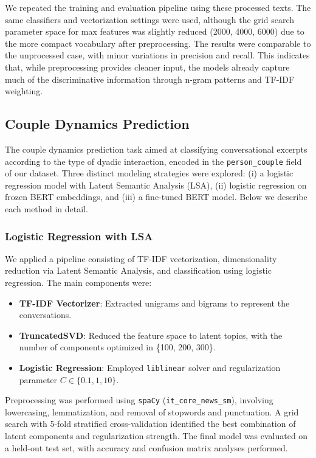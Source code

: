 \documentclass[conference]{IEEEtran}
\begin{document}
We repeated the training and evaluation pipeline using these processed texts. The same classifiers and vectorization settings were used, although the grid search parameter space for max features was slightly reduced (2000, 4000, 6000) due to the more compact vocabulary after preprocessing. The results were comparable to the unprocessed case, with minor variations in precision and recall. This indicates that, while preprocessing provides cleaner input, the models already capture much of the discriminative information through n-gram patterns and TF-IDF weighting.

\subsection{Couple Dynamics Prediction}

The couple dynamics prediction task aimed at classifying conversational excerpts according to the type of dyadic interaction, encoded in the \texttt{person\_couple} field of our dataset. Three distinct modeling strategies were explored: (i) a logistic regression model with Latent Semantic Analysis (LSA), (ii) logistic regression on frozen BERT embeddings, and (iii) a fine-tuned BERT model. Below we describe each method in detail.

\subsubsection{Logistic Regression with LSA}

We applied a pipeline consisting of TF-IDF vectorization, dimensionality reduction via Latent Semantic Analysis, and classification using logistic regression. The main components were:
\begin{itemize}
    \item \textbf{TF-IDF Vectorizer}: Extracted unigrams and bigrams to represent the conversations.
    \item \textbf{TruncatedSVD}: Reduced the feature space to latent topics, with the number of components optimized in \{100, 200, 300\}.
    \item \textbf{Logistic Regression}: Employed \texttt{liblinear} solver and regularization parameter \(C \in \{0.1, 1, 10\}\).
\end{itemize}
Preprocessing was performed using \texttt{spaCy} (\texttt{it\_core\_news\_sm}), involving lowercasing, lemmatization, and removal of stopwords and punctuation. A grid search with 5-fold stratified cross-validation identified the best combination of latent components and regularization strength. The final model was evaluated on a held-out test set, with accuracy and confusion matrix analyses performed.
\end{document}
